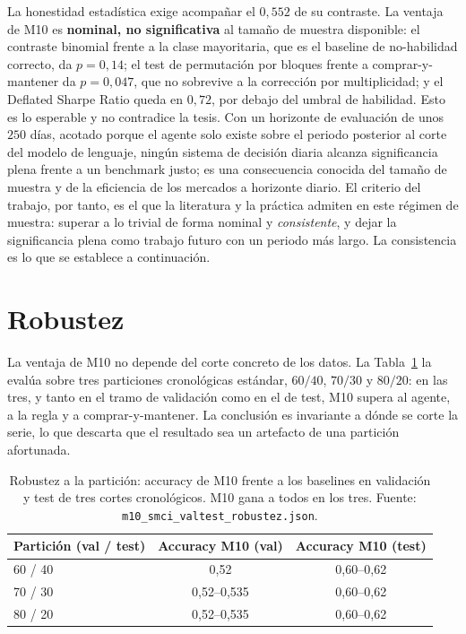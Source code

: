 
La honestidad estadística exige acompañar el $0{,}552$ de su contraste. La ventaja de M10 es \textbf{nominal, no significativa} al tamaño de muestra disponible: el contraste binomial frente a la clase mayoritaria, que es el baseline de no-habilidad correcto, da $p = 0{,}14$; el test de permutación por bloques frente a comprar-y-mantener da $p = 0{,}047$, que no sobrevive a la corrección por multiplicidad; y el Deflated Sharpe Ratio queda en $0{,}72$, por debajo del umbral de habilidad. Esto es lo esperable y no contradice la tesis. Con un horizonte de evaluación de unos $250$ días, acotado porque el agente solo existe sobre el periodo posterior al corte del modelo de lenguaje, ningún sistema de decisión diaria alcanza significancia plena frente a un benchmark justo; es una consecuencia conocida del tamaño de muestra y de la eficiencia de los mercados a horizonte diario. El criterio del trabajo, por tanto, es el que la literatura y la práctica admiten en este régimen de muestra: superar a lo trivial de forma nominal y \emph{consistente}, y dejar la significancia plena como trabajo futuro con un periodo más largo. La consistencia es lo que se establece a continuación.

\section{Robustez}
\label{sec:robustez}

La ventaja de M10 no depende del corte concreto de los datos. La Tabla~\ref{tab:smci-robustez} la evalúa sobre tres particiones cronológicas estándar, $60/40$, $70/30$ y $80/20$: en las tres, y tanto en el tramo de validación como en el de test, M10 supera al agente, a la regla y a comprar-y-mantener. La conclusión es invariante a dónde se corte la serie, lo que descarta que el resultado sea un artefacto de una partición afortunada.


\begin{table}[htbp]
\centering
\caption{Robustez a la partición: accuracy de M10 frente a los baselines en validación y test de tres cortes cronológicos. M10 gana a todos en los tres. Fuente: \texttt{m10\_smci\_valtest\_robustez.json}.}
\label{tab:smci-robustez}
\begin{tabular}{lcc}
\hline
Partición (val / test) & Accuracy M10 (val) & Accuracy M10 (test) \\
\hline
60 / 40 & 0,52 & 0,60--0,62 \\
70 / 30 & 0,52--0,535 & 0,60--0,62 \\
80 / 20 & 0,52--0,535 & 0,60--0,62 \\
\hline
\end{tabular}
\end{table}

